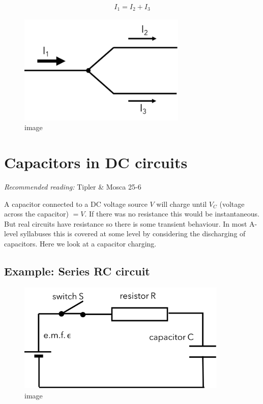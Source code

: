 \documentclass[
]{book}
\begin{document}
\[\begin{aligned}
I_1 = I_2 + I_3
\end{aligned}\]

\begin{figure}
\centering
\includegraphics[width=80mm,height=\textheight]{Figures/junction_rule.png}
\caption{image}
\end{figure}

\hypertarget{capacitors-in-dc-circuits}{%
\section{Capacitors in DC circuits}\label{capacitors-in-dc-circuits}}

\emph{Recommended reading:} Tipler \& Mosca 25-6

A capacitor connected to a DC voltage source \(V\) will charge until
\(V _C\) (voltage across the capacitor) \(= V\). If there was no resistance
this would be instantaneous. But real circuits have resistance so there
is some transient behaviour. In most A-level syllabuses this is covered
at some level by considering the discharging of capacitors. Here we look
at a capacitor charging.

\hypertarget{example-series-rc-circuit}{%
\subsection*{Example: Series RC circuit}\label{example-series-rc-circuit}}

\begin{figure}
\centering
\includegraphics[width=100mm,height=\textheight]{Figures/seriesRC.png}
\caption{image}
\end{figure}
\end{document}
